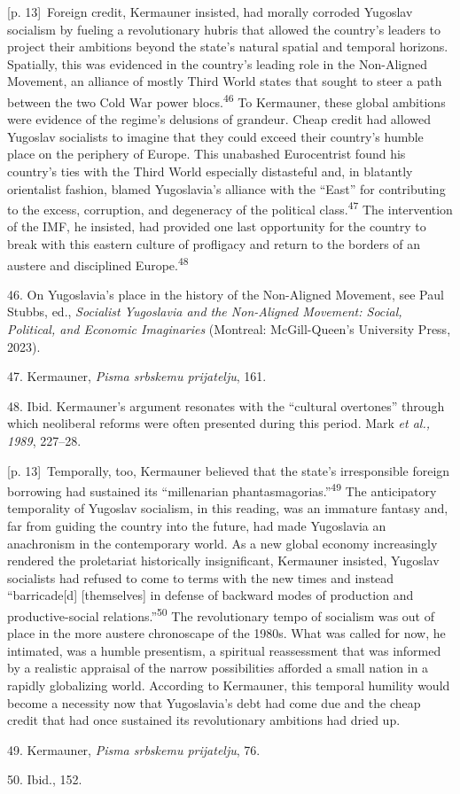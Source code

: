\documentclass[10pt,a4paper]{article}
\begin{document}
{\scriptsize\color{gray} [p. 13]}\ Foreign credit, Kermauner insisted, had morally corroded Yugoslav socialism by fueling a revolutionary hubris that allowed the country’s leaders to project their ambitions beyond the state’s natural spatial and temporal horizons. Spatially, this was evidenced in the country’s leading role in the Non-Aligned Movement, an alliance of mostly Third World states that sought to steer a path between the two Cold War power blocs.\nobreak\textsuperscript{46} To Kermauner, these global ambitions were evidence of the regime’s delusions of grandeur. Cheap credit had allowed Yugoslav socialists to imagine that they could exceed their country’s humble place on the periphery of Europe. This unabashed Eurocentrist found his country’s ties with the Third World especially distasteful and, in blatantly orientalist fashion, blamed Yugoslavia’s alliance with the “East” for contributing to the excess, corruption, and degeneracy of the political class.\nobreak\textsuperscript{47} The intervention of the IMF, he insisted, had provided one last opportunity for the country to break with this eastern culture of profligacy and return to the borders of an austere and disciplined Europe.\nobreak\textsuperscript{48}\par{\small 46. On Yugoslavia’s place in the history of the Non-Aligned Movement, see Paul Stubbs, ed., \textit{Socialist Yugoslavia and the Non-Aligned Movement: Social, Political, and Economic Imaginaries} (Montreal: McGill-Queen’s University Press, 2023).\par}{\small 47. Kermauner, \textit{Pisma srbskemu prijatelju}, 161.\par}{\small 48. Ibid. Kermauner’s argument resonates with the “cultural overtones” through which neoliberal reforms were often presented during this period. Mark \textit{et al., 1989}, 227–28.\par}
{\scriptsize\color{gray} [p. 13]}\ Temporally, too, Kermauner believed that the state’s irresponsible foreign borrowing had sustained its “millenarian phantasmagorias.”\nobreak\textsuperscript{49} The anticipatory temporality of Yugoslav socialism, in this reading, was an immature fantasy and, far from guiding the country into the future, had made Yugoslavia an anachronism in the contemporary world. As a new global economy increasingly rendered the proletariat historically insignificant, Kermauner insisted, Yugoslav socialists had refused to come to terms with the new times and instead “barricade[d] [themselves] in defense of backward modes of production and productive-social relations.”\nobreak\textsuperscript{50} The revolutionary tempo of socialism was out of place in the more austere chronoscape of the 1980s. What was called for now, he intimated, was a humble presentism, a spiritual reassessment that was informed by a realistic appraisal of the narrow possibilities afforded a small nation in a rapidly globalizing world. According to Kermauner, this temporal humility would become a necessity now that Yugoslavia’s debt had come due and the cheap credit that had once sustained its revolutionary ambitions had dried up.\par{\small 49. Kermauner, \textit{Pisma srbskemu prijatelju}, 76.\par}{\small 50. Ibid., 152.\par}
\end{document}
